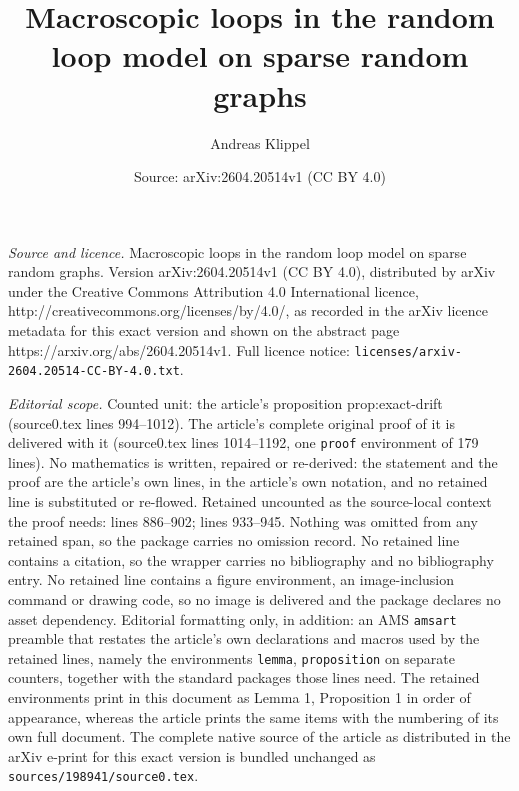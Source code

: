 \documentclass[10pt,a4paper]{amsart}
\title{Macroscopic loops in the random loop model on sparse random graphs}
\author{Andreas Klippel}
\date{Source: arXiv:2604.20514v1 (CC BY 4.0)}
\begin{document}
\maketitle

\noindent\emph{Source and licence.} Macroscopic loops in the random loop model on sparse random graphs. Version arXiv:2604.20514v1 (CC BY 4.0), distributed by arXiv under the Creative Commons Attribution 4.0 International licence, http://creativecommons.org/licenses/by/4.0/, as recorded in the arXiv licence metadata for this exact version and shown on the abstract page https://arxiv.org/abs/2604.20514v1. Full licence notice: \texttt{licenses/arxiv-2604.20514-CC-BY-4.0.txt}.\par\smallskip

\noindent\textit{Editorial scope.} Counted unit: the article's proposition prop:exact-drift (source0.tex lines 994--1012). The article's complete original proof of it is delivered with it (source0.tex lines 1014--1192, one \texttt{proof} environment of 179 lines). No mathematics is written, repaired or re-derived: the statement and the proof are the article's own lines, in the article's own notation, and no retained line is substituted or re-flowed.  Retained uncounted as the source-local context the proof needs: lines 886--902; lines 933--945.  Nothing was omitted from any retained span, so the package carries no omission record.  No retained line contains a citation, so the wrapper carries no bibliography and no bibliography entry.  No retained line contains a figure environment, an image-inclusion command or drawing code, so no image is delivered and the package declares no asset dependency.  Editorial formatting only, in addition: an AMS \texttt{amsart} preamble that restates the article's own declarations and macros used by the retained lines, namely the environments \texttt{lemma}, \texttt{proposition} on separate counters, together with the standard packages those lines need.  The retained environments print in this document as Lemma 1, Proposition 1 in order of appearance, whereas the article prints the same items with the numbering of its own full document.  The complete native source of the article as distributed in the arXiv e-print for this exact version is bundled unchanged as \texttt{sources/198941/source0.tex}.
\end{document}

